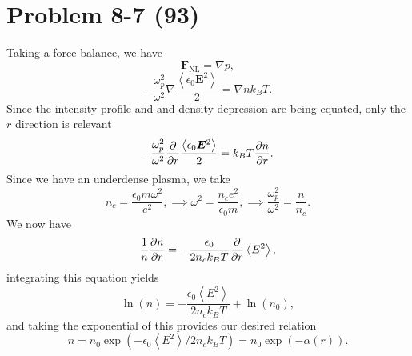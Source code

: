 \section*{Problem 8-7 (93)}
\label{sec:8-7}
Taking a force balance, we have
\begin{equation*}
	\bm{F}_\text{NL} = \nabla p,
\end{equation*}
\begin{equation*}
	-\dfrac{\omega_p^2}{\omega^2}\nabla\dfrac{\left<\epsilon_0\bm{E}^2\right>}{2} = \nabla nk_BT.
\end{equation*}
Since the intensity profile and and density depression are being equated, only the \(r\) direction is relevant
\begin{equation*}
	-\dfrac{\omega_p^2}{\omega^2}\frac{\partial }{\partial r}\dfrac{\left<\epsilon_0\bm{E}^2\right>}{2} = k_BT\frac{\partial n}{\partial r}.
\end{equation*}
Since we have an underdense plasma, we take
\begin{equation*}
	n_c = \dfrac{\epsilon_0m\omega^2}{e^2}, \implies \omega^2 = \dfrac{n_ce^2}{\epsilon_0 m}, \implies \dfrac{\omega^2_p}{\omega^2} = \dfrac{n}{n_c}.
\end{equation*}
We now have
\begin{equation*}
	\dfrac{1}{n}\frac{\partial n}{\partial r} = - \dfrac{\epsilon_0}{2n_ck_BT}\frac{\partial }{\partial r}\left<E^2\right>,
\end{equation*}
integrating this equation yields
\begin{equation*}
	\ln (n) = -\dfrac{\epsilon_0\left<E^2\right>}{2n_ck_BT} + \ln(n_0),
\end{equation*}
and taking the exponential of this provides our desired relation
\begin{equation*}
	n = n_0\exp\left(-\epsilon_0\left<E^2\right>/2n_ck_BT \right) = n_0\exp(-\alpha(r)).
\end{equation*}

